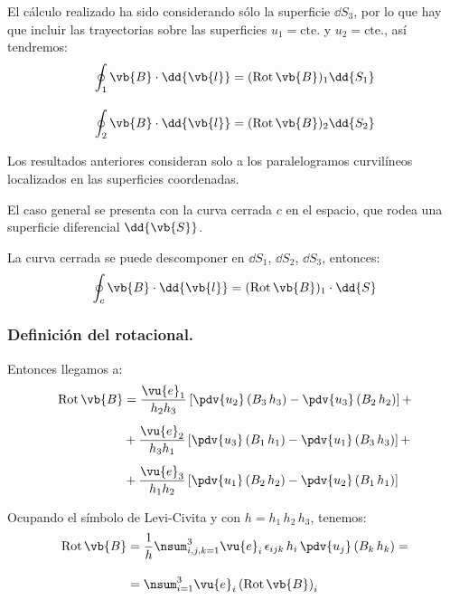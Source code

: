 El cálculo realizado ha sido considerando sólo la superficie $\dd{S_{3}}$, por lo que hay que incluir las trayectorias sobre las superficies $u_{1} = \mbox{cte.}$ y $u_{2} = \mbox{cte.}$, así tendremos:
\begin{align*}
\oint_{1} \vb{B} \cdot \dd{\vb{l}} &= ({\rm{Rot}} \, \vb{B})_{1} \dd{S_{1}} \\[1em]
\oint_{2} \vb{B} \cdot \dd{\vb{l}} &= ({\rm{Rot}} \, \vb{B})_{2} \dd{S_{2}}
\end{align*}

Los resultados anteriores consideran solo a los paralelogramos curvilíneos localizados en las superficies coordenadas.
\par
El caso general se presenta con la curva cerrada $c$ en el espacio, que rodea una superficie diferencial $\dd{\vb{S}}$.
\par
La curva cerrada se puede descomponer en $\dd{S_{1}}$, $\dd{S_{2}}$, $\dd{S_{3}}$, entonces:
\begin{align*}
\oint_{c} \vb{B} \cdot \dd{\vb{l}} = ({\rm{Rot}} \, \vb{B})_{1} \cdot \dd{S} 
\end{align*}

\subsubsection{Definición del rotacional.}

Entonces llegamos a:
\begin{align*}
{\rm Rot} \, \vb{B} &= \dfrac{\vu{e}_{1}}{h_{2} h_{3}} \left[ \displaystyle \pdv{u_{2}} \left( B_{3} \, h_{3} \right) - \pdv{u_{3}} \left( B_{2} \, h_{2} \right) \right] + \\[0.5em]
&+ \dfrac{\vu{e}_{2}}{h_{3} h_{1}} \left[ \displaystyle \pdv{u_{3}} \left( B_{1} \, h_{1} \right) - \pdv{u_{1}} \left( B_{3} \, h_{3} \right) \right] + \\[0.5em]
&+ \dfrac{\vu{e}_{3}}{h_{1} h_{2}} \left[ \displaystyle \pdv{u_{1}} \left( B_{2} \, h_{2} \right) - \pdv{u_{2}} \left( B_{1} \, h_{1} \right) \right]
\end{align*}

Ocupando el símbolo de Levi-Civita y con $h = h_{1} \, h_{2} \, h_{3}$, tenemos:
\begin{align}
\begin{aligned}
{\rm Rot} \, \vb{B} &= \dfrac{1}{h} \nsum_{i,j,k=1}^{3} \vu{e}_{i} \, \epsilon_{ijk} \, h_{i} \, \pdv{u_{j}} \left( B_{k} \, h_{k} \right) = \\[1em]
&= \nsum_{i=1}^{3} \vu{e}_{i} \left( {\rm Rot} \, \vb{B} \right)_{i}
\end{aligned}
\label{eq:ecuacion_01_34}
\end{align}

